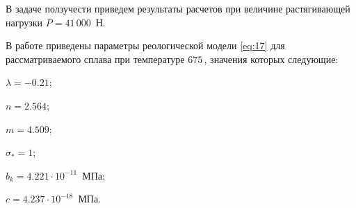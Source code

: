 В задаче ползучести приведем результаты расчетов при величине растягивающей нагрузки $P = 41\,000 $~Н. 

В работе \cite{25-Radchenko-Saushkin-Tsventov-2016} приведены параметры реологической модели \eqref{eq:17} для рассматриваемого сплава при температуре $675\,$\textcelsius, значения которых следующие:

$\lambda = -0.21$;

$n = 2.564$;

$m = 4.509$;

$\sigma_{\ast} = 1$;

$b_k = 4.221 \cdot 10^{-11}$~МПа;

$c = 4.237 \cdot 10^{-18}$~МПа.







